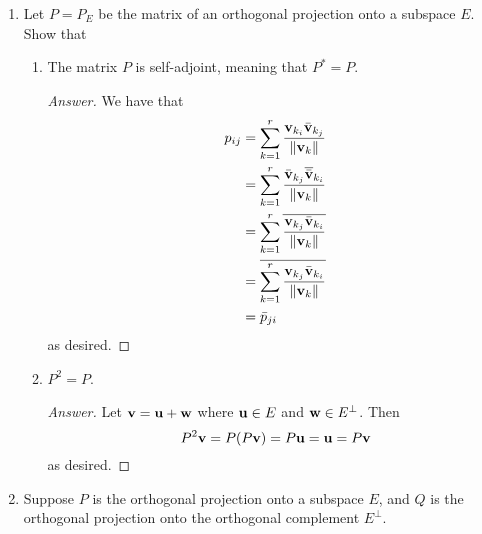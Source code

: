 \documentclass[../psets.tex]{subfiles}
\begin{document}
\begin{enumerate}[label={\textbf{3.\arabic*.}}]
\begin{enumerate}
\begin{proof}[Answer]
            It's eigenvalues are $n-1$ and $-1$, with respective geometric and algebraic multiplicities 1 and $n-1$.
        \end{proof}
        \item Compute $\det(A-I)$.
        \begin{proof}[Answer]
            By part (b), $\det(A-\lambda I)=(n-\lambda)^1(0-\lambda)^{n-1}$. Thus,
            \begin{equation*}
                \det(A-I) = (n-1)(-1)^{n-1}
            \end{equation*}
            as desired.
        \end{proof}
    \end{enumerate}
    \item Let $P=P_E$ be the matrix of an orthogonal projection onto a subspace $E$. Show that
    \begin{enumerate}
        \item The matrix $P$ is self-adjoint, meaning that $P^*=P$.
        \begin{proof}[Answer]
            We have that
            \begingroup
            \allowdisplaybreaks
            \begin{align*}
                p_{ij} &= \sum_{k=1}^r\frac{\mathbf{v}_{k_i}\bar{\mathbf{v}}_{k_j}}{\norm{\mathbf{v}_k}}\\
                &= \sum_{k=1}^r\frac{\bar{\mathbf{v}}_{k_j}\overline{\bar{\mathbf{v}}}_{k_i}}{\norm{\mathbf{v}_k}}\\
                &= \sum_{k=1}^r\overline{\frac{\mathbf{v}_{k_j}\bar{\mathbf{v}}_{k_i}}{\norm{\mathbf{v}_k}}}\\
                &= \overline{\sum_{k=1}^r\frac{\mathbf{v}_{k_j}\bar{\mathbf{v}}_{k_i}}{\norm{\mathbf{v}_k}}}\\
                &= \bar{p}_{ji}
            \end{align*}
            \endgroup
            as desired.
        \end{proof}
        \item $P^2=P$.
        \begin{proof}[Answer]
            Let $\mathbf{v}=\mathbf{u}+\mathbf{w}$ where $\mathbf{u}\in E$ and $\mathbf{w}\in E^\perp$. Then
            \begin{equation*}
                P^2\mathbf{v} = P(P\mathbf{v}) = P\mathbf{u} = \mathbf{u} = P\mathbf{v}
            \end{equation*}
            as desired.
        \end{proof}
    \end{enumerate}
    \item Suppose $P$ is the orthogonal projection onto a subspace $E$, and $Q$ is the orthogonal projection onto the orthogonal complement $E^\perp$.

\end{enumerate}
\end{document}

